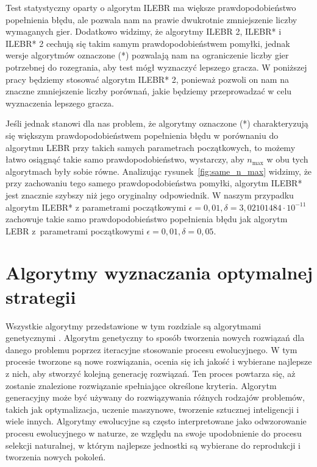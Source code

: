 \documentclass[inzynierska]{pwr_wmat_praca_dyplomowa}
\theoremstyle{plain}
\numberwithin{theorem}{chapter}
\theoremstyle{definition}
\numberwithin{theorem}{chapter}
\newcommand{\nmax}{n_{\text{max}}}
\begin{document}
	Test statystyczny oparty o algorytm ILEBR ma większe prawdopodobieństwo popełnienia błędu, ale pozwala nam na prawie dwukrotnie zmniejszenie liczby wymaganych gier. Dodatkowo widzimy, że algorytmy  ILEBR 2, ILEBR* i ILEBR* 2 cechują się takim samym prawdopodobieństwem pomyłki, jednak wersje algorytmów oznaczone (*) pozwalają nam na ograniczenie liczby gier potrzebnej do rozegrania, aby test mógł wyznaczyć lepszego gracza. W poniższej pracy będziemy stosować algorytm ILEBR* 2, ponieważ pozwoli on nam na znaczne zmniejszenie liczby porównań, jakie będziemy przeprowadzać w celu wyznaczenia lepszego gracza. 
	
	Jeśli jednak stanowi dla nas problem, że algorytmy oznaczone (*) charakteryzują się większym prawdopodobieństwem popełnienia błędu w porównaniu do algorytmu LEBR przy takich samych parametrach początkowych, to możemy łatwo osiągnąć takie samo prawdopodobieństwo, wystarczy, aby $\nmax$ w obu tych algorytmach były sobie równe.
	Analizując rysunek~\ref{fig:same_n_max} widzimy, że przy zachowaniu tego samego prawdopodobieństwa pomyłki, algorytm ILEBR* jest znacznie szybszy niż jego oryginalny odpowiednik. W naszym przypadku algorytm ILEBR* z parametrami początkowymi $\epsilon =0,01, \delta =3,02101484 \cdot 10^{-11}$ zachowuje takie samo prawdopodobieństwo popełnienia błędu jak algorytm LEBR z~parametrami początkowymi $\epsilon=0,01, \delta=0,05$.

	
	
	\chapter{Algorytmy wyznaczania optymalnej strategii}
	Wszystkie algorytmy przedstawione w tym rozdziale są algorytmami genetycznymi \cite{Figielska2006}. 
	Algorytm genetyczny to sposób tworzenia nowych rozwiązań dla danego problemu poprzez iteracyjne stosowanie procesu ewolucyjnego. W tym procesie tworzone są nowe rozwiązania, ocenia się ich jakość i wybierane najlepsze z nich, aby stworzyć kolejną generację rozwiązań. Ten proces powtarza się, aż zostanie znalezione rozwiązanie spełniające określone kryteria. Algorytm generacyjny może być używany do rozwiązywania różnych rodzajów problemów, takich jak optymalizacja, uczenie maszynowe, tworzenie sztucznej inteligencji i wiele innych. Algorytmy ewolucyjne są często interpretowane jako odwzorowanie procesu ewolucyjnego w naturze, ze względu na swoje upodobnienie do procesu selekcji naturalnej, w którym najlepsze jednostki są wybierane do reprodukcji i tworzenia nowych pokoleń.
	
\end{document}

